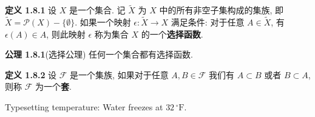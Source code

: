 \documentclass{ctexart}
\begin{document}
\textbf{定义 1.8.1} 设 $X$ 是一个集合. 记 $\widetilde{X}$ 为 $X$ 中的所有非空子集构成的集族, 即 $\widetilde{X} = \mathscr{P}(X) - \{\emptyset\}$. 如果一个映射 $\epsilon : \widetilde{X} \to X$ 满足条件: 对于任意 $A \in \widetilde{X}$, 有 $\epsilon(A) \in A$, 则此映射 $\epsilon$ 称为集合 $X$ 的一个\textbf{选择函数}.

\textbf{公理 1.8.1}(选择公理) 任何一个集合都有选择函数.

\textbf{定义 1.8.2} 设 $\mathscr{F}$ 是一个集族, 如果对于任意 $A,B \in \mathscr{F}$ 我们有 $A\subset B$ 或者 $B \subset A$, 则称 $\mathscr{F}$ 为一个\textbf{套}.

Typesetting temperature: Water freezes at $32\,^{\circ}\mathrm{F}$.
\end{document}
